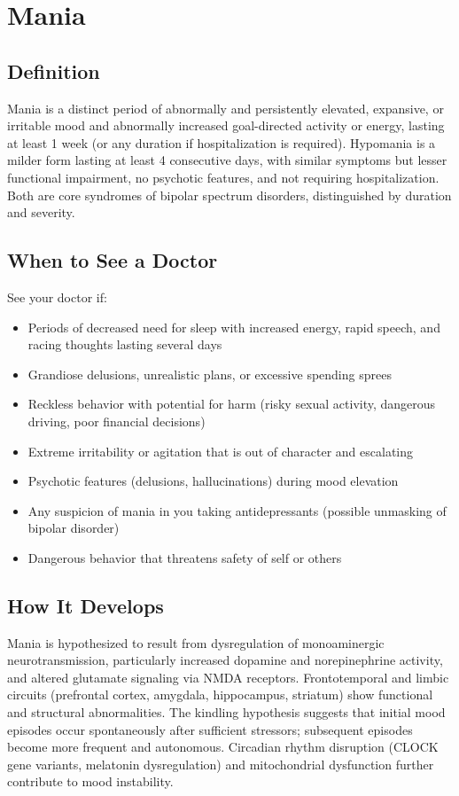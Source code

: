 \chapter{Mania}

\section*{Definition}
Mania is a distinct period of abnormally and persistently elevated, expansive, or irritable mood and abnormally increased goal-directed activity or energy, lasting at least 1 week (or any duration if hospitalization is required). Hypomania is a milder form lasting at least 4 consecutive days, with similar symptoms but lesser functional impairment, no psychotic features, and not requiring hospitalization. Both are core syndromes of bipolar spectrum disorders, distinguished by duration and severity.

\section*{When to See a Doctor}
See your doctor if:
\begin{itemize}
  \item Periods of decreased need for sleep with increased energy, rapid speech, and racing thoughts lasting several days
  \item Grandiose delusions, unrealistic plans, or excessive spending sprees
  \item Reckless behavior with potential for harm (risky sexual activity, dangerous driving, poor financial decisions)
  \item Extreme irritability or agitation that is out of character and escalating
  \item Psychotic features (delusions, hallucinations) during mood elevation
  \item Any suspicion of mania in you taking antidepressants (possible unmasking of bipolar disorder)
  \item Dangerous behavior that threatens safety of self or others
\end{itemize}

\section*{How It Develops}
Mania is hypothesized to result from dysregulation of monoaminergic neurotransmission, particularly increased dopamine and norepinephrine activity, and altered glutamate signaling via NMDA receptors. Frontotemporal and limbic circuits (prefrontal cortex, amygdala, hippocampus, striatum) show functional and structural abnormalities. The kindling hypothesis suggests that initial mood episodes occur spontaneously after sufficient stressors; subsequent episodes become more frequent and autonomous. Circadian rhythm disruption (CLOCK gene variants, melatonin dysregulation) and mitochondrial dysfunction further contribute to mood instability.

